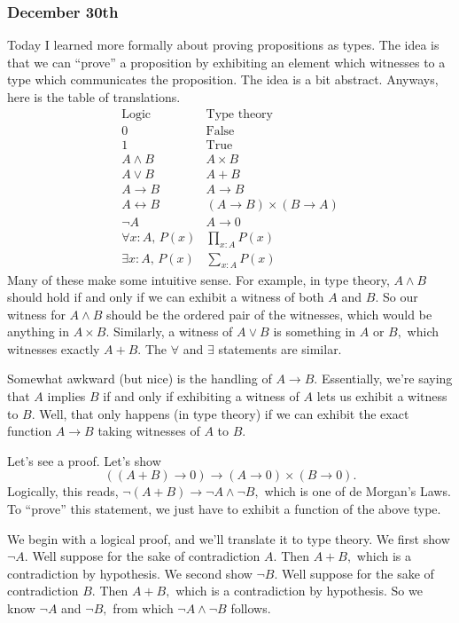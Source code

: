 \subsubsection{December 30th}
Today I learned more formally about proving propositions as types. The idea is that we can ``prove'' a proposition by exhibiting an element which witnesses to a type which communicates the proposition. The idea is a bit abstract. Anyways, here is the table of translations.
\[\begin{array}{c|c}
    \text{Logic} & \text{Type theory} \\
    \hline
    0 & \text{False} \\
    1 & \text{True} \\
    A\land B & A\times B \\
    A\lor B & A+B \\
    A\to B & A\to B \\
    A\leftrightarrow B & (A\to B)\times(B\to A) \\
    \lnot A & A\to0 \\
    \hline
    \forall x:A,\,P(x) & \prod_{x:A}P(x) \\
    \exists x:A,\,P(x) & \sum_{x:A}P(x)
\end{array}\]
Many of these make some intuitive sense. For example, in type theory, $A\land B$ should hold if and only if we can exhibit a witness of both $A$ and $B.$ So our witness for $A\land B$ should be the ordered pair of the witnesses, which would be anything in $A\times B.$ Similarly, a witness of $A\lor B$ is something in $A$ or $B,$ which witnesses exactly $A+B.$ The $\forall$ and $\exists$ statements are similar.

Somewhat awkward (but nice) is the handling of $A\to B.$ Essentially, we're saying that $A$ implies $B$ if and only if exhibiting a witness of $A$ lets us exhibit a witness to $B.$ Well, that only happens (in type theory) if we can exhibit the exact function $A\to B$ taking witnesses of $A$ to $B.$

Let's see a proof. Let's show
\[((A+B)\to0)\to(A\to0)\times(B\to0).\]
Logically, this reads, $\lnot(A+B)\to\lnot A\land\lnot B,$ which is one of de Morgan's Laws. To ``prove'' this statement, we just have to exhibit a function of the above type.

We begin with a logical proof, and we'll translate it to type theory. We first show $\lnot A.$ Well suppose for the sake of contradiction $A.$ Then $A+B,$ which is a contradiction by hypothesis. We second show $\lnot B.$ Well suppose for the sake of contradiction $B.$ Then $A+B,$ which is a contradiction by hypothesis. So we know $\lnot A$ and $\lnot B,$ from which $\lnot A\land\lnot B$ follows.

